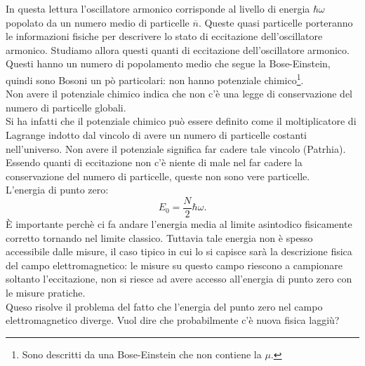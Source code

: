 In questa lettura l'oscillatore armonico corrisponde al livello di energia $\hbar\omega $ popolato da un numero medio di particelle $\overline{n}$. Queste quasi particelle porteranno le informazioni fisiche per descrivere lo stato di eccitazione dell'oscillatore armonico. Studiamo allora questi quanti di eccitazione dell'oscillatore armonico.\\
Questi hanno un numero di popolamento medio che segue la Bose-Einstein, quindi sono Bosoni un pò particolari: non hanno potenziale chimico\footnote{Sono descritti da una Bose-Einstein che non contiene la $\mu $.}.\\
Non avere il potenziale chimico indica che non c'è una legge di conservazione del numero di particelle globali.\\
Si ha infatti che il potenziale chimico può essere definito come il moltiplicatore di Lagrange indotto dal vincolo di avere un numero di particelle costanti nell'universo. Non avere il potenziale significa far cadere tale vincolo (Patrhia).\\ 
Essendo quanti di eccitazione non c'è niente di male nel far cadere la conservazione del numero di particelle, queste non sono vere particelle.\\
L'energia di punto zero:
\[
	E_0 = \frac{N}{2}\hbar\omega 
.\] 
È importante perchè ci fa andare l'energia media al limite asintodico fisicamente corretto tornando nel limite classico. 
Tuttavia tale energia non è spesso accessibile dalle misure, il caso tipico in cui lo si capisce sarà la descrizione fisica del campo elettromagnetico: le misure su questo campo riescono a campionare soltanto l'eccitazione, non si riesce ad avere accesso all'energia di punto zero con le misure pratiche.\\
Queso risolve il problema del fatto che l'energia del punto zero nel campo elettromagnetico diverge. Vuol dire che probabilmente c'è nuova fisica laggiù?
